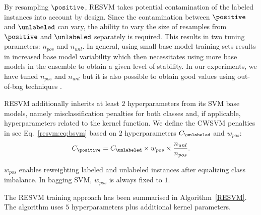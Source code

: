 By resampling $\positive$, RESVM takes potential contamination of the labeled instances into account by design. Since the contamination between $\positive$ and $\unlabeled$ can vary, the ability to vary the size of resamples from $\positive$ and $\unlabeled$ separately is required. This results in two tuning parameters: $n_{pos}$ and $n_{unl}$. In general, using small base model training sets results in increased base model variability which then necessitates using more base models in the ensemble to obtain a given level of stability. In our experiments, we have tuned $n_{pos}$ and $n_{unl}$ but it is also possible to obtain good values using out-of-bag techniques \citep{martinez2010out}.

RESVM additionally inherits at least $2$ hyperparameters from its SVM base models, namely misclassification penalties for both classes and, if applicable, hyperparameters related to the kernel function. We define the CWSVM penalties in see Eq.~\eqref{resvm:eq:bsvm} based on $2$ hyperparameters $C_{\unlabeled}$ and $w_{pos}$:
\begin{equation}
C_{\positive} = C_{\unlabeled} \times w_{pos} \times \frac{n_{unl}}{n_{pos}}. \label{eq:resvmpenalties}
\end{equation}

$w_{pos}$ enables reweighting labeled and unlabeled instances after equalizing class imbalance. In bagging SVM, $w_{pos}$ is always fixed to $1$. 

The RESVM training approach has been summarised in Algorithm~\ref{RESVM}. The algorithm uses $5$ hyperparameters plus additional kernel parameters.

\newlength\mydatalen
\newcommand\mydata[1]{%
  \settowidth\mydatalen{\KwData{}}%
  \setlength\hangindent{\mydatalen}%
  \hspace*{\mydatalen}#1\\}

\newlength\myinputlen
\newcommand\myinput[1]{%
  \settowidth\myinputlen{\KwIn{}}%
  \setlength\hangindent{\myinputlen}%
  \hspace*{\myinputlen}#1\\}



